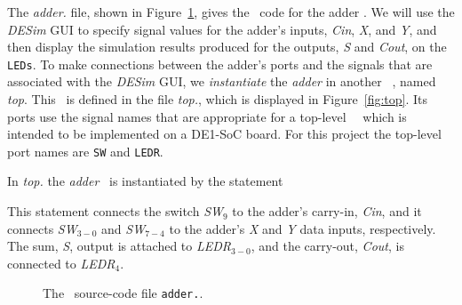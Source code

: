 The {\it adder.\hdlFileExt} file, shown in Figure~\ref{fig:addern}, gives the \hdlName~code
for the adder \hdlModuleName.  We will use the {\it DESim} GUI to specify signal 
values for the adder's inputs, {\it Cin}, {\it X}, and {\it Y}, and then display the
simulation results produced for the outputs, {\it S} and {\it Cout}, on the \texttt{LEDs}. 
To make connections between the adder's ports and the signals that are associated with the
{\it DESim} GUI, we {\it instantiate} the {\it adder} in another \hdlName~\hdlModuleName,
named {\it top}. This \hdlModuleName~is defined in the file {\it top.\hdlFileExt}, which
is displayed in Figure~\ref{fig:top}. Its ports use the signal names that are appropriate for a
top-level \hdlName~\hdlModuleName~which is intended to be implemented on a DE1-SoC board.
For this project the top-level port names are \texttt{SW} and  \texttt{LEDR}.

In {\it top.\hdlFileExt} the {\it adder} \hdlModuleName~is instantiated by the statement
\ifverilog
    \ifnotSV
        
    \else
        
    \fi
\else
    
\fi

This statement connects the switch {\it SW}$_9$ to the adder's carry-in, {\it Cin}, 
and it connects {\it SW}$_{3-0}$ and  {\it SW}$_{7-4}$ to the adder's {\it X} and {\it Y} 
data inputs, respectively.  The sum, {\it S}, output is attached to {\it LEDR}$_{3-0}$, and 
the carry-out, {\it Cout}, is connected to {\it LEDR}$_4$.

\begin{figure}[h]
\begin{center}
\begin{minipage}[h]{15 cm}
    \ifverilog
        \ifnotSV
            
        \else
            
        \fi
    \else
        
    \fi
\end{minipage}
	\caption{The \hdlName~source-code file \texttt{adder.\hdlFileExt}.}
	\label{fig:addern}
\end{center}
\end{figure}

